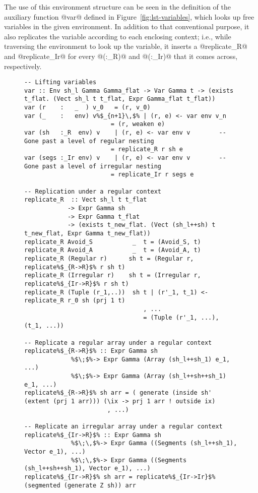 The use of this environment structure can be seen in the definition of the auxiliary function @var@ defined in Figure~\ref{fig:lst-variables}, which looks up free variables in the given environment. In addition to that conventional purpose, it also replicates the variable according to each enclosing context; i.e., while traversing the environment to look up the variable, it inserts a @replicate_R@ and @replicate_Ir@ for every @(:_R)@ and @(:_Ir)@ that it comes across, respectively.
%
\begin{figure}
\begin{lstlisting}[style=ndp]
-- Lifting variables
var :: Env sh_l Gamma Gamma_flat -> Var Gamma t -> (exists t_flat. (Vect sh_l t t_flat, Expr Gamma_flat t_flat))
var (r    :   _  ) v_0   = (r, v_0)
var (_    :   env) v%$_{n+1}\,$% | (r, e) <- var env v_n
                        = (r, weaken e)
var (sh   :_R  env) v    | (r, e) <- var env v        -- Gone past a level of regular nesting
                        = replicate_R r sh e
var (segs :_Ir env) v    | (r, e) <- var env v        -- Gone past a level of irregular nesting
                        = replicate_Ir r segs e

-- Replication under a regular context
replicate_R  :: Vect sh_l t t_flat
            -> Expr Gamma sh
            -> Expr Gamma t_flat
            -> (exists t_new_flat. (Vect (sh_l++sh) t t_new_flat, Expr Gamma t_new_flat))
replicate_R Avoid_S           _  t = (Avoid_S, t)
replicate_R Avoid_A           _  t = (Avoid_A, t)
replicate_R (Regular r)      sh t = (Regular r, replicate%$_{R->R}$% r sh t)
replicate_R (Irregular r)    sh t = (Irregular r, replicate%$_{Ir->R}$% r sh t)
replicate_R (Tuple (r_1,..))  sh t | (r'_1, t_1) <- replicate_R r_0 sh (prj 1 t)
                                 , ...
                                 = (Tuple (r'_1, ...), (t_1, ...))

-- Replicate a regular array under a regular context
replicate%$_{R->R}$% :: Expr Gamma sh
             %$\;$%-> Expr Gamma (Array (sh_l++sh_1) e_1, ...)
             %$\;$%-> Expr Gamma (Array (sh_l++sh++sh_1) e_1, ...)
replicate%$_{R->R}$% sh arr = ( generate (inside sh' (extent (prj 1 arr))) (\ix -> prj 1 arr ! outside ix)
                       , ...)

-- Replicate an irregular array under a regular context
replicate%$_{Ir->R}$% :: Expr Gamma sh
             %$\;\,$%-> Expr Gamma ((Segments (sh_l++sh_1), Vector e_1), ...)
             %$\;\,$%-> Expr Gamma ((Segments (sh_l++sh++sh_1), Vector e_1), ...)
replicate%$_{Ir->R}$% sh arr = replicate%$_{Ir->Ir}$% (segmented (generate Z sh)) arr


\end{lstlisting}
\end{figure}
